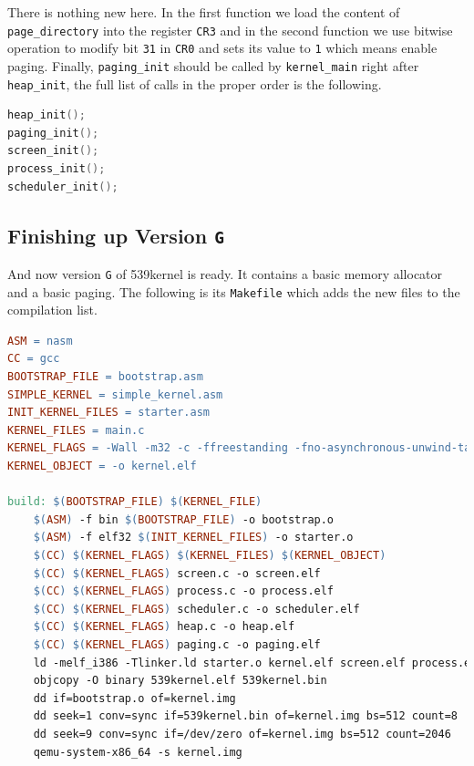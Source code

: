 There is nothing new here. In the first function we load the content of
\lstinline!page_directory! into the register \lstinline!CR3! and in the
second function we use bitwise operation to modify bit \lstinline!31! in
\lstinline!CR0! and sets its value to \lstinline!1! which means enable
paging. Finally, \lstinline!paging_init! should be called by
\lstinline!kernel_main! right after \lstinline!heap_init!, the full list
of calls in the proper order is the following.

\begin{lstlisting}[language=C]
heap_init();
paging_init();  
screen_init();
process_init();
scheduler_init();
\end{lstlisting}

\subsection{\texorpdfstring{Finishing up Version
\texttt{G}}{Finishing up Version G}}\label{finishing-up-version-g}

And now version \lstinline!G! of 539kernel is ready. It contains a basic
memory allocator and a basic paging. The following is its
\lstinline!Makefile! which adds the new files to the compilation list.

\begin{lstlisting}[language=make]
ASM = nasm
CC = gcc
BOOTSTRAP_FILE = bootstrap.asm 
SIMPLE_KERNEL = simple_kernel.asm
INIT_KERNEL_FILES = starter.asm
KERNEL_FILES = main.c
KERNEL_FLAGS = -Wall -m32 -c -ffreestanding -fno-asynchronous-unwind-tables -fno-pie
KERNEL_OBJECT = -o kernel.elf

build: $(BOOTSTRAP_FILE) $(KERNEL_FILE)
    $(ASM) -f bin $(BOOTSTRAP_FILE) -o bootstrap.o
    $(ASM) -f elf32 $(INIT_KERNEL_FILES) -o starter.o 
    $(CC) $(KERNEL_FLAGS) $(KERNEL_FILES) $(KERNEL_OBJECT)
    $(CC) $(KERNEL_FLAGS) screen.c -o screen.elf
    $(CC) $(KERNEL_FLAGS) process.c -o process.elf
    $(CC) $(KERNEL_FLAGS) scheduler.c -o scheduler.elf
    $(CC) $(KERNEL_FLAGS) heap.c -o heap.elf
    $(CC) $(KERNEL_FLAGS) paging.c -o paging.elf
    ld -melf_i386 -Tlinker.ld starter.o kernel.elf screen.elf process.elf scheduler.elf heap.elf paging.elf -o 539kernel.elf
    objcopy -O binary 539kernel.elf 539kernel.bin
    dd if=bootstrap.o of=kernel.img
    dd seek=1 conv=sync if=539kernel.bin of=kernel.img bs=512 count=8
    dd seek=9 conv=sync if=/dev/zero of=kernel.img bs=512 count=2046
    qemu-system-x86_64 -s kernel.img
\end{lstlisting}

